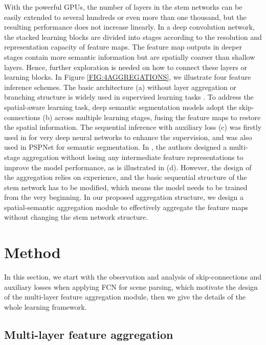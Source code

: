 \documentclass[10pt,twocolumn,twoside]{IEEEtran}
\begin{document}
With the powerful GPUs, the number of layers in the stem networks can be easily extended to several hundreds or even more than one thousand, but the resulting performance does not increase linearly. In a deep convolution network, the stacked learning blocks are divided into stages according to the resolution and representation capacity of feature maps. The feature map outputs in deeper stages contain more semantic information but are spatially coarser than shallow layers. Hence, further exploration is needed on how to connect these layers or learning blocks. In Figure \ref{FIG:4AGGREGATIONS}, we illustrate four feature inference schemes. The basic architecture (a) without layer aggregation or branching structure is widely used in supervised learning tasks \cite{CVPR16:RESNET,CVPR18:SENET, CVPR15:FCN, ARXIV:DILATED,NIPS15:FASTER_RCNN,CVPR15:CAP}. To address the spatial-aware learning task, deep semantic segmentation models\cite{MICCAI15:UNET,TPAMI:DEEPLAB} adopt the skip-connections (b) across multiple learning stages, fusing the feature maps to restore the spatial information. The sequential inference with auxiliary loss (c) was firstly used in \cite{CVPR15:GOOGLENET} for very deep neural networks to enhance the supervision, and was also used in PSPNet \cite{CVPR17:PSPNET} for semantic segmentation. In \cite{CVPR18:DLA}, the authors designed a multi-stage aggregation without losing any intermediate feature representations to improve the model performance, as is illustrated in (d). However, the design of the aggregation relies on experience, and the basic sequential structure of the stem network has to be modified, which means the model needs to be trained from the very beginning. In our proposed aggregation structure, we design a spatial-semantic aggregation module to effectively aggregate the feature maps without changing the stem network structure.

\section{Method}
\label{SEC:METHOD}

In this section, we start with the observation and analysis of skip-connections and auxiliary losses when applying FCN for scene parsing, which motivate the design of the multi-layer feature aggregation module, then we give the details of the whole learning framework.

\subsection{Multi-layer feature aggregation}
\label{SUBSEC:MLFA}
\end{document}
